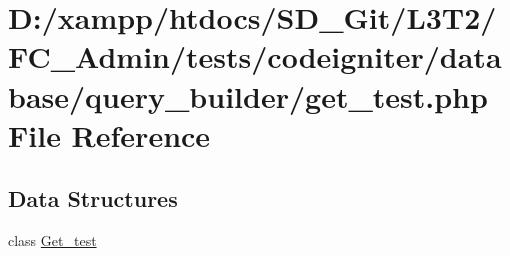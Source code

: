 \hypertarget{_admin_2tests_2codeigniter_2database_2query__builder_2get__test_8php}{}\section{D\+:/xampp/htdocs/\+S\+D\+\_\+\+Git/\+L3\+T2/\+F\+C\+\_\+\+Admin/tests/codeigniter/database/query\+\_\+builder/get\+\_\+test.php File Reference}
\label{_admin_2tests_2codeigniter_2database_2query__builder_2get__test_8php}
\subsection*{Data Structures}
\begin{DoxyCompactItemize}
\item 
class \hyperlink{class_get__test}{Get\+\_\+test}
\end{DoxyCompactItemize}
